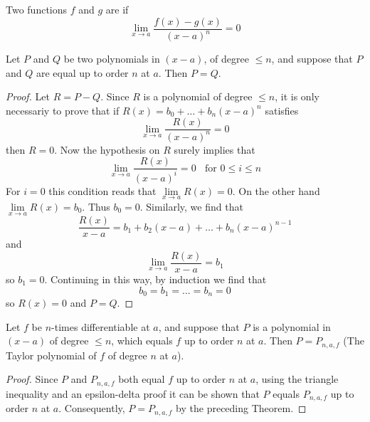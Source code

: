 \documentclass[12pt, a4paper, oneside, openright, titlepage]{book}
\begin{document}
\begin{defn}
    Two functions $f$ and $g$ are  if \begin{equation*}
        \lim\limits_{x\rightarrow a}\frac{f(x) - g(x)}{(x-a)^n} = 0
    \end{equation*}
\end{defn}


\begin{thm}
    Let $P$ and $Q$ be two polynomials in $(x-a)$, of degree $\leq n$, and suppose that $P$ and $Q$ are equal up to order $n$ at $a$. Then $P = Q$.
\end{thm}
\begin{proof}
    Let $R= P-Q$. Since $R$ is a polynomial of degree $\leq n$, it is only necessariy to prove that if $R(x) = b_0+\hdots +b_n(x-a)^n$ satisfies \begin{equation*}
        \lim\limits_{x\rightarrow a}\frac{R(x)}{(x-a)^n} = 0
    \end{equation*}
    then $R = 0$. Now the hypothesis on $R$ surely implies that \begin{equation*}
        \lim\limits_{x\rightarrow a}\frac{R(x)}{(x-a)^i} = 0\;\;\text{ for } 0\leq i \leq n
    \end{equation*}
    For $i = 0$ this condition reads that $\lim\limits_{x\rightarrow a}R(x) = 0$. On the other hand $\lim\limits_{x\rightarrow a}R(x) = b_0$. Thus $b_0 = 0$. Similarly, we find that \begin{equation*}
        \frac{R(x)}{x-a} = b_1+b_2(x-a)+\hdots + b_n(x-a)^{n-1}
    \end{equation*}
    and \begin{equation*}
        \lim\limits_{x\rightarrow a}\frac{R(x)}{x-a} = b_1
    \end{equation*}
    so $b_1 = 0$. Continuing in this way, by induction we find that \begin{equation*}
        b_0 = b_1 = ... = b_n = 0
    \end{equation*}
    so $R(x) = 0$ and $P = Q$.
\end{proof}


\begin{cor}
    Let $f$ be $n$-times differentiable at $a$, and suppose that $P$ is a polynomial in $(x-a)$ of degree $\leq n$, which equals $f$ up to order $n$ at $a$. Then $P = P_{n,a,f}$ (The Taylor polynomial of $f$ of degree $n$ at $a$).
\end{cor}
\begin{proof}
    Since $P$ and $P_{n,a,f}$ both equal $f$ up to order $n$ at $a$, using the triangle inequality and an epsilon-delta proof it can be shown that $P$ equals $P_{n,a,f}$ up to order $n$ at $a$. Consequently, $P = P_{n,a,f}$ by the preceding Theorem.
\end{proof}
\end{document}

